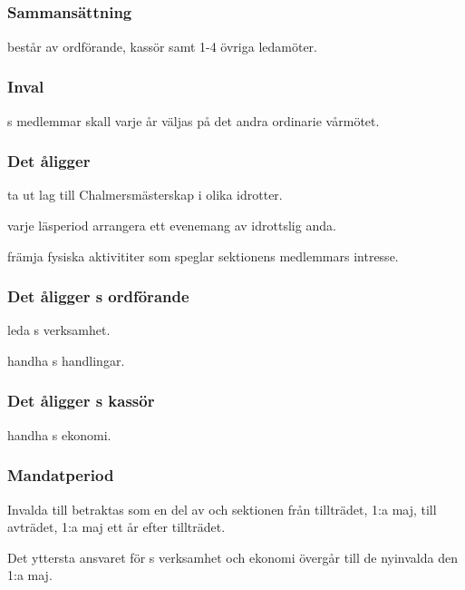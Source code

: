 \subsection{\FRITIDFULL}
\subsubsection{Sammansättning}
\FRITID{} består av ordförande, kassör samt 1-4 övriga ledamöter.

\subsubsection{Inval}
\FRITID{}s medlemmar skall varje år väljas på det andra ordinarie vårmötet.

\subsubsection{Det åligger \FRITID}
\begin{att}
	\item ta ut lag till Chalmersmästerskap i olika idrotter.
	\item varje läsperiod arrangera ett evenemang av idrottslig anda.
	\item främja fysiska aktivititer som speglar sektionens medlemmars intresse.
\end{att}

\subsubsection{Det åligger \FRITID{}s ordförande}
\begin{att}
	\item leda \FRITID{}s verksamhet.
	\item handha \FRITID{}s handlingar.
\end{att}

\subsubsection{Det åligger \FRITID{}s kassör}
\begin{att}
	\item handha \FRITID{}s ekonomi.
\end{att}

\subsubsection{Mandatperiod}
Invalda till \FRITID{} betraktas som en del av \FRITID{} och sektionen från tillträdet, 1:a maj, till avträdet, 1:a maj ett år efter tillträdet.

Det yttersta ansvaret för \FRITID{}s verksamhet och ekonomi övergår till de nyinvalda den 1:a maj.